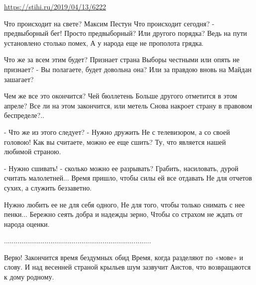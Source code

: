  
 
 
 
 

\url{https://stihi.ru/2019/04/13/6222}

Что происходит на свете?
Максим Пестун
Что происходит сегодня? - предвыборный бег!
Просто предвыборный? Или другого порядка?
Ведь на пути установлено столько помех,
А у народа еще не прополота грядка.

Что же за всем этим будет? Признает страна
Выборы честными или опять не признает?
- Вы полагаете, будет довольна она?
Или за правдою вновь на Майдан зашагает?

Чем же все это окончится? Чей бюллетень
Больше другого отметится в этом апреле?
Все ли на этом закончится, или метель
Снова накроет страну в правовом беспределе?..

- Что же из этого следует? - Нужно дружить
Не с телевизором, а со своей головою!
Как вы считаете, можно ее еще сшить?
Ту, что является нашей любимой страною.

- Нужно сшивать! - сколько можно ее разрывать?
Грабить, насиловать, дурой считать малолетней...
Время пришло, чтобы силы ей все отдавать
Не для отчетов сухих, а служить беззаветно.

Нужно любить ее не для себя одного,
Не для того, чтобы только снимать с нее пенки...
Бережно сеять добра и надежды зерно,
Чтобы со страхом не ждать от народа оценки.

............................................................................

Верю! Закончится время бездумных обид
Время, когда разделяют по «мове» и слову.
И над весенней страной крыльев шум зазвучит
Аистов, что возвращаются к дому родному.
